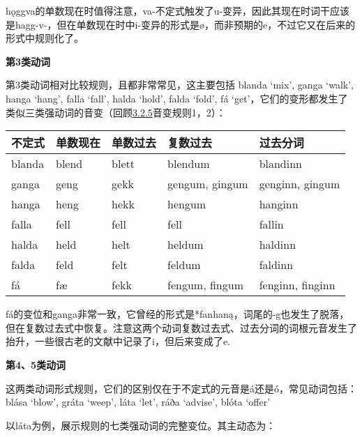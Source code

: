 hǫggva的单数现在时值得注意，va-不定式触发了u-变异，因此其现在时词干应该是hagg-v-，但在单数现在时中i-变异的形式是ø，而非预期的e，不过它又在后来的形式中规则化了。

\textbf{第3类动词}

第3类动词相对比较规则，且都非常常见，这主要包括 blanda `mix', ganga
`walk', hanga `hang', falla `fall', halda `hold', falda `fold', fá
`get'，它们的变形都发生了类似三类强动词的音变（回顾\hyperref[ux7b2cux4e09ux5f3aux53d8ux4f4dux6cd5]{3.2.5}音变规则1，2）：

\begin{longtable}{lllll}
\toprule
不定式 & 单数现在 & 单数过去 & 复数过去 & 过去分词 \\
\midrule
\endhead
\bottomrule
\endfoot
blanda & blend & blett & blendum & blandinn \\
ganga & geng & gekk & gengum, gingum & genginn, gingum \\
hanga & heng & hekk & hengum & hanginn \\
falla & fell & fell & fell & fallin \\
halda & held & helt & heldum & haldinn \\
falda & feld & felt & feldum & faldinn \\
fá & fæ & fekk & fengum, fingum & fenginn, finginn \\
\end{longtable}

fá的变位和ganga非常一致，它曾经的形式是*fanhaną，词尾的-g也发生了脱落，但在复数过去式中恢复。注意这两个动词复数过去式、过去分词的词根元音发生了抬升，一些很古老的文献中记录了i，但后来变成了e.

\textbf{第4、5类动词}

这两类动词形式规则，它们的区别仅在于不定式的元音是á还是ó，常见动词包括：blása
`blow', gráta `weep', láta `let', ráða `advise', blóta `offer‌'

以láta为例，展示规则的七类强动词的完整变位。其主动态为：

